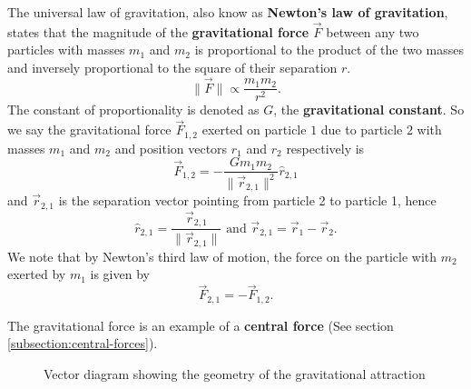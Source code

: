 The universal law of gravitation, also know as \textbf{Newton's law of gravitation}, states that the magnitude of the \textbf{gravitational force} $\vec{F}$ between any two particles with masses $m_1$ and $m_2$ is proportional to the product of the two masses and inversely proportional to the square of their separation $r$.
\begin{equation*}
    \| \vec{F} \| \propto \frac{m_1 m_2}{r^2}.
\end{equation*}
The constant of proportionality is denoted as $G$, the \textbf{gravitational constant}. So we say the gravitational force $\vec{F}_{1,2}$ exerted on particle $1$ due to particle $2$ with masses $m_1$ and $m_2$ and position vectors $r_1$ and $r_2$ respectively is 
\begin{equation}
    \vec{F}_{1,2} = - \frac{G m_1 m_2}{\| \vec{r}_{2,1} \|^2} \hat{r}_{2,1}
    \label{eq:gravitational-force}
\end{equation}
and $\vec{r}_{2,1}$ is the separation vector pointing from particle 2 to particle 1, hence
\begin{equation}
    \hat{r}_{2,1} = \frac{\vec{r}_{2,1}}{\| \vec{r}_{2,1} \|} \text{ and } \vec{r}_{2, 1} = \vec{r}_1 - \vec{r}_2.
\end{equation}
We note that by Newton's third law of motion, the force on the particle with $m_2$ exerted by $m_1$ is given by
\begin{equation}
    \vec{F}_{2, 1} = -\vec{F}_{1, 2}.
\end{equation}

The gravitational force is an example of a \textbf{central force} (See section \ref{subsection:central-forces}).

\begin{figure}[h!]
    \centering
    \caption{Vector diagram showing the geometry of the gravitational attraction}
\end{figure}
\FloatBarrier

